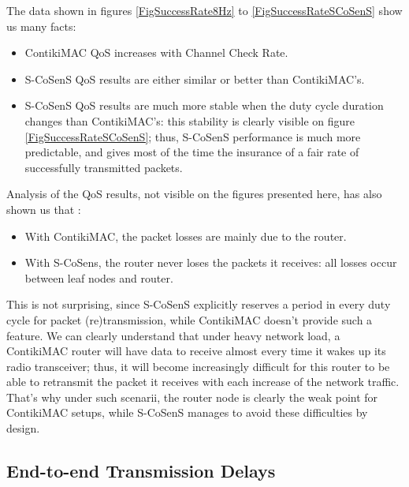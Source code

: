 \documentclass[a4paper,twoside]{article}
\begin{document}
The data shown in figures \ref{FigSuccessRate8Hz} to
\ref{FigSuccessRateSCoSenS} show us many facts:

\begin{itemize}

\item ContikiMAC QoS increases with Channel Check Rate.

\item S-CoSenS QoS results are either similar or better than ContikiMAC's.

\item S-CoSenS QoS results are much more stable when the duty cycle duration
      changes than ContikiMAC's: this stability is clearly visible on figure
      \ref{FigSuccessRateSCoSenS}; thus, S-CoSenS performance is much more
      predictable, and gives most of the time the insurance of a fair
      rate of successfully transmitted packets.

\end{itemize}

Analysis of the QoS results, not visible on the figures presented here, has
also shown us that :

\begin{itemize}

\item With ContikiMAC, the packet losses are mainly due to the router.

\item With S-CoSens, the router never loses the packets it receives:
      all losses occur between leaf nodes and router.

\end{itemize}

This is not surprising, since S-CoSenS explicitly reserves a period in every
duty cycle for packet (re)transmission, while ContikiMAC doesn't provide
such a feature. We can clearly understand that under heavy network load,
a ContikiMAC router will have data to receive almost every time it wakes up
its radio transceiver; thus, it will become increasingly difficult for this
router to be able to retransmit the packet it receives with each increase
of the network traffic. That's why under such scenarii, the router node
is clearly the weak point for ContikiMAC setups, while S-CoSenS manages
to avoid these difficulties by design.



\subsection{End-to-end Transmission Delays}
\end{document}
